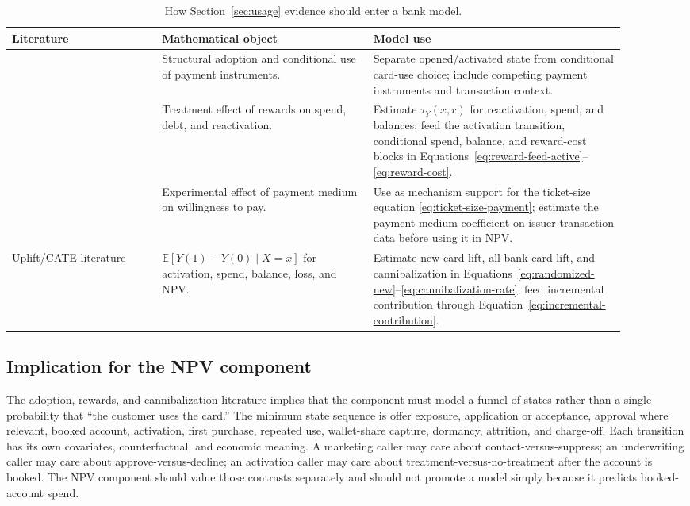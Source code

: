 \documentclass[11pt]{article}
\newcommand{\E}{\mathbb{E}}
\newcommand{\1}{\mathbf{1}}
\begin{document}
\begin{table}[t]
\centering
\caption{How Section~\ref{sec:usage} evidence should enter a bank model.}
\label{tab:usage-to-model}
\begin{tabular}{p{0.22\linewidth}p{0.31\linewidth}p{0.37\linewidth}}
\toprule
Literature & Mathematical object & Model use \\
\midrule
\citet{koulayev2012payment}
  & Structural adoption and conditional use of payment instruments.
  & Separate opened/activated state from conditional card-use choice; include
    competing payment instruments and transaction context. \\
\citet{agarwal2010rewards}
  & Treatment effect of rewards on spend, debt, and reactivation.
  & Estimate $\tau_Y(x,r)$ for reactivation, spend, and balances; feed the
    activation transition, conditional spend, balance, and reward-cost blocks
    in Equations~\eqref{eq:reward-feed-active}--\eqref{eq:reward-cost}. \\
\citet{prelec2001creditcard}
  & Experimental effect of payment medium on willingness to pay.
  & Use as mechanism support for the ticket-size equation
    \eqref{eq:ticket-size-payment}; estimate the payment-medium coefficient on
    issuer transaction data before using it in NPV. \\
Uplift/CATE literature
  & $\E[Y(1)-Y(0)\mid X=x]$ for activation, spend, balance, loss, and NPV.
  & Estimate new-card lift, all-bank-card lift, and cannibalization in
    Equations~\eqref{eq:randomized-new}--\eqref{eq:cannibalization-rate}; feed
    incremental contribution through Equation~\eqref{eq:incremental-contribution}. \\
\bottomrule
\end{tabular}
\end{table}

\subsection{Implication for the NPV component}
\label{subsec:usage-component-implication}

The adoption, rewards, and cannibalization literature implies that the
component must model a funnel of states rather than a single probability that
``the customer uses the card.'' The minimum state sequence is offer exposure,
application or acceptance, approval where relevant, booked account, activation,
first purchase, repeated use, wallet-share capture, dormancy, attrition, and
charge-off. Each transition has its own covariates, counterfactual, and
economic meaning. A marketing caller may care about contact-versus-suppress;
an underwriting caller may care about approve-versus-decline; an activation
caller may care about treatment-versus-no-treatment after the account is
booked. The NPV component should value those contrasts separately and should
not promote a model simply because it predicts booked-account spend.
\end{document}
